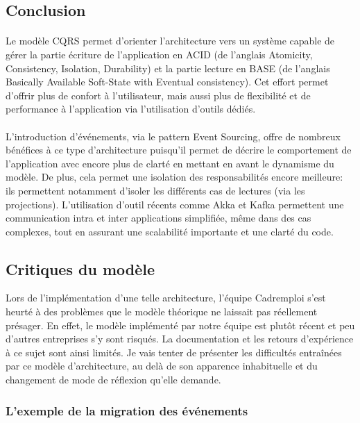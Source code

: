 \subsection{Conclusion}
\paragraph{}
Le modèle CQRS permet d'orienter l'architecture vers un système capable de gérer la partie écriture de l'application en ACID (de l'anglais Atomicity, Consistency, Isolation, Durability) et la partie lecture en BASE (de l'anglais Basically Available Soft-State with Eventual consistency).
Cet effort permet d'offrir plus de confort à l'utilisateur, mais aussi plus de flexibilité et de performance à l'application via l'utilisation d'outils dédiés.
\paragraph{}
L'introduction d'événements, via le pattern Event Sourcing, offre de nombreux bénéfices à ce type d'architecture puisqu'il permet de décrire le comportement de l'application avec encore plus de clarté en mettant en avant le dynamisme du modèle.
De plus, cela permet une isolation des responsabilités encore meilleure: ils permettent notamment d'isoler les différents cas de lectures (via les projections).
L'utilisation d'outil récents comme Akka et Kafka permettent une communication intra et inter applications simplifiée, même dans des cas complexes, tout en assurant une scalabilité importante et une clarté du code.

\subsection{Critiques du modèle}
Lors de l'implémentation d'une telle architecture, l'équipe Cadremploi s'est heurté à des problèmes que le modèle théorique ne laissait pas réellement présager.
En effet, le modèle implémenté par notre équipe est plutôt récent et peu d'autres entreprises s'y sont risqués.
La documentation et les retours d'expérience à ce sujet sont ainsi limités.
Je vais tenter de présenter les difficultés entraînées par ce modèle d'architecture, au delà de son apparence inhabituelle et du changement de mode de réflexion qu'elle demande.
\subsubsection{L'exemple de la migration des événements}

